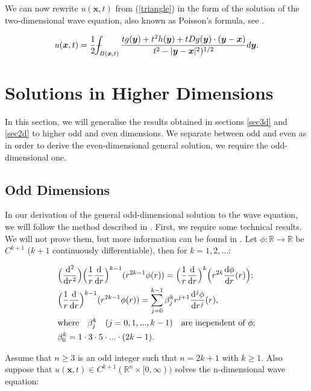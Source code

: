 \documentclass[a4paper, 12pt]{article}
\def\Xint#1{\mathchoice
{\XXint\displaystyle\textstyle{#1}}%
{\XXint\textstyle\scriptstyle{#1}}%
{\XXint\scriptstyle\scriptscriptstyle{#1}}%
{\XXint\scriptscriptstyle\scriptscriptstyle{#1}}%
\!\int}
\def\XXint#1#2#3{{\setbox0=\hbox{$#1{#2#3}{\int}$ }
\vcenter{\hbox{$#2#3$ }}\kern-.6\wd0}}
\def\dashint{\Xint-}
\numberwithin{equation}{section}
\begin{document}
We can now rewrite $u(\boldsymbol{x},t)$ from (\ref{triangle}) in the form of
the solution of the two-dimensional wave equation, also known as Poisson's
formula, see \cite{Ev}.
 
\begin{equation} \label{poiss}
    u(\boldsymbol{x},t)=\frac{1}{2}\dashint_{B(\boldsymbol{x},t)} \frac{tg(\boldsymbol{y})+t^2h(\boldsymbol{y})+tDg(\boldsymbol{y})\cdot (\boldsymbol{y}-\boldsymbol{x})}{t^2-|\boldsymbol{y}-\boldsymbol{x}|^2)^{1/2}}d\boldsymbol{y}.
\end{equation}

\section{Solutions in Higher Dimensions}

In this section, we will generalise the results obtained in sections \ref{sec3d}
and \ref{sec2d} to higher odd and even dimensions. We separate between odd and
even as in order to derive the even-dimensional general solution, we require the
odd-dimensional one.

\subsection{Odd Dimensions}

In our derivation of the general odd-dimensional solution to the wave equation,
we will follow the method described in \cite{Ev}. First, we require some
technical results. We will not prove them, but more information can be found in
\cite[Lemma 2]{Ev}. Let $\phi:\mathbb{R} \to \mathbb{R}$ be $C^{k+1}$ ($k+1$
continuously differentiable), then for $k=1, 2, ...$:

\begin{align}
    &\Big(\diff[2]{}{r}\Big)\Big( \frac{1}{r} \diff{}{r}\Big)^{k-1}(r^{2k-1}\phi(r))=\Big( \frac{1}{r} \diff{}{r}\Big)^k \Big(r^{2k} \diff{\phi}{r}(r) \Big); \label{i} \\
    &\Big( \frac{1}{r} \diff{}{r}\Big)^{k-1}(r^{2k-1}\phi(r))=\sum^{k-1}_{j=0} \beta_{j}^{k} r^{j+1} \diff[j]{\phi}{r}(r), \label{ii} \\
    & \textrm{where} \quad \beta_{j}^{k} \quad (j=0,1,...,k-1) \quad \textrm{are inependent of $\phi$}; \notag \\
    & \beta_{0}^{k}=1 \cdot 3 \cdot 5 \cdot ... \cdot (2k-1). \label{iii}
\end{align}

Assume that $n \ge 3$ is an odd integer such that $n=2k+1$ with $k \ge 1$. Also
suppose that $u(\boldsymbol{x},t) \in C^{k+1}(\mathbb{R}^n \times [0, \infty))$
solves the n-dimensional wave equation:
\end{document}
